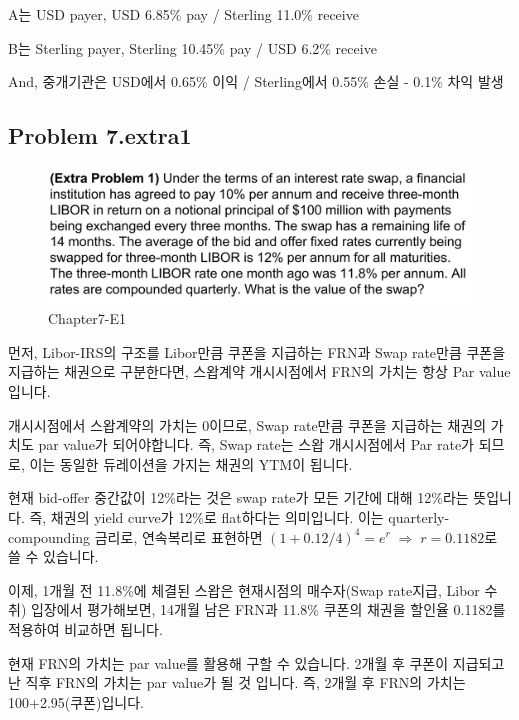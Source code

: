 \documentclass[
  letterpaper,
  DIV=11,
  numbers=noendperiod]{scrreprt}
\begin{document}
A는 USD payer, USD 6.85\% pay / Sterling 11.0\% receive

B는 Sterling payer, Sterling 10.45\% pay / USD 6.2\% receive

And, 중개기관은 USD에서 0.65\% 이익 / Sterling에서 0.55\% 손실 - 0.1\%
차익 발생

\subsection*{\texorpdfstring{\textbf{Problem
7.extra1}}{Problem 7.extra1}}\label{problem-7.extra1}

\begin{figure}[H]

{\centering \includegraphics{images/선물옵션_7-extra1.png}

}

\caption{Chapter7-E1}

\end{figure}%

먼저, Libor-IRS의 구조를 Libor만큼 쿠폰을 지급하는 FRN과 Swap rate만큼
쿠폰을 지급하는 채권으로 구분한다면, 스왑계약 개시시점에서 FRN의 가치는
항상 Par value입니다.

개시시점에서 스왑계약의 가치는 0이므로, Swap rate만큼 쿠폰을 지급하는
채권의 가치도 par value가 되어야합니다. 즉, Swap rate는 스왑
개시시점에서 Par rate가 되므로, 이는 동일한 듀레이션을 가지는 채권의
YTM이 됩니다.

현재 bid-offer 중간값이 12\%라는 것은 swap rate가 모든 기간에 대해
12\%라는 뜻입니다. 즉, 채권의 yield curve가 12\%로 flat하다는
의미입니다. 이는 quarterly-compounding 금리로, 연속복리로 표현하면
\((1+0.12/4)^4=e^r\;\Rightarrow\;r=0.1182\)로 쓸 수 있습니다.

이제, 1개월 전 11.8\%에 체결된 스왑은 현재시점의 매수자(Swap rate지급,
Libor 수취) 입장에서 평가해보면, 14개월 남은 FRN과 11.8\% 쿠폰의 채권을
할인율 0.1182를 적용하여 비교하면 됩니다.

현재 FRN의 가치는 par value를 활용해 구할 수 있습니다. 2개월 후 쿠폰이
지급되고 난 직후 FRN의 가치는 par value가 될 것 입니다. 즉, 2개월 후
FRN의 가치는 100+2.95(쿠폰)입니다.
\end{document}
